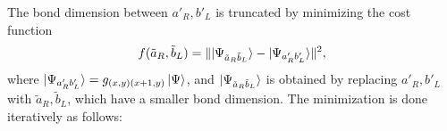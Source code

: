 \documentclass[11pt]{article}
\def\shift{0.5}
\begin{document}
The bond dimension between $a'_R, b'_L$ is truncated by minimizing the cost function
\begin{equation}
    f(\tilde{a}_R, \tilde{b}_L) = \lVert 
        \ket{\Psi_{\tilde{a}_R \tilde{b}_L}} 
        - \ket{\Psi_{a'_R b'_L}}
    \rVert^2,
\end{equation}
where $\ket{\Psi_{a'_R b'_L}} = g_{(x,y)(x+1,y)} \ket{\Psi}$, and $\ket{\Psi_{\tilde{a}_R \tilde{b}_L}}$ is obtained by replacing $a'_R, b'_L$ with $\tilde{a}_R, \tilde{b}_L$, which have a smaller bond dimension. The minimization is done iteratively as follows:
\begingroup
\newcommand{\backbone}{
    \draw (3,0) -- +(2,0);
    \draw (3,4) -- +(2,0);
    \ctmsw{0}{0} \ctmse{8}{0} 
    \ctmnw{0}{4} \ctmne{8}{4} 
    \ctmn{2}{4} \ctmn{6}{4} \ctme{8}{2} 
    \ctms{2}{0} \ctms{6}{0} \ctmw{0}{2}
    \tensora{2}{2}[blue]
    \node[anchor=north east] at (2,2) {$X$};
    \tensora{6}{2}
    \node[anchor=north east] at (6,2) {$Y$};
    \begin{scope}[shift={(\shift,\shift)}, opacity=0.4]
        \tensora{2}{2}[blue]
        \node[anchor=south west] at (2,2) {$X^\dagger$};
        \tensora{6}{2}
        \node[anchor=south west] at (6,2) {$Y^\dagger$};
    \end{scope}
}
\end{document}
